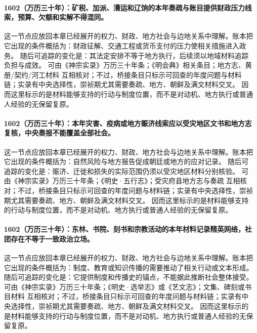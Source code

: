 \paragraph{1602（万历三十年）：矿税、加派、漕运和辽饷的本年奏疏与账目提供财政压力线索，预算、欠额和实解不得混同。} 这一节点应放回本章已经展开的权力、财政、地方社会与边地关系中理解。账本把它出现的条件概括为：财政征解、交通工程或货币支付的压力使相关措施进入政务。 随后可追踪的变化是：其法定安排不等于地方执行，后续须以地域材料追踪负担与成效。 可由《神宗实录》万历三十年条；《明会典》相关条目；地方志、黄册/契约/河工材料 互相核对；不过，桥接条目只标示可回查的年度问题与材料链；实录有中央选择性，崇祯期尤其需要奏疏、地方、朝鲜及满文材料交叉。 因而这里标示的是材料能够支持的行动与制度位置，而不是对动机、地方执行或普通人经验的无保留复原。

\paragraph{1602（万历三十年）：本年灾害、疫病或地方赈济线索应以受灾地区文书和地方志复核，中央奏报不能覆盖全部社会。} 这一节点应放回本章已经展开的权力、财政、地方社会与边地关系中理解。账本把它出现的条件概括为：自然风险与地方报告促成朝廷或地方的应对记录。 随后可追踪的变化是：赈济、迁徙和损失的实际范围仍须以受灾地区材料分别核验。 可由《神宗实录》万历三十年条；《明史·五行志》；受灾府县地方志与奏疏 互相核对；不过，桥接条目只标示可回查的年度问题与材料链；实录有中央选择性，崇祯期尤其需要奏疏、地方、朝鲜及满文材料交叉。 因而这里标示的是材料能够支持的行动与制度位置，而不是对动机、地方执行或普通人经验的无保留复原。

\paragraph{1602（万历三十年）：东林、书院、刻书和宗教活动的本年材料记录精英网络，社团存在不等于一致政治立场。} 这一节点应放回本章已经展开的权力、财政、地方社会与边地关系中理解。账本把它出现的条件概括为：制度、教育或知识传播的需要推动了相关行动或文本形成。 随后可追踪的变化是：它提供制度和传播史的锚点，不能据此推断社会整体接受。 可由《神宗实录》万历三十年条；《明史·选举志》或《艺文志》；文集、碑刻或书目材料 互相核对；不过，桥接条目只标示可回查的年度问题与材料链；实录有中央选择性，崇祯期尤其需要奏疏、地方、朝鲜及满文材料交叉。 因而这里标示的是材料能够支持的行动与制度位置，而不是对动机、地方执行或普通人经验的无保留复原。

